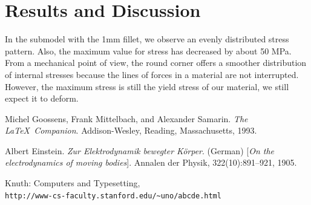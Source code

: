 \documentclass[12pt]{article}
\begin{document}
\pagebreak
\section{Results and Discussion}

In the submodel with the 1mm fillet, we observe an evenly distributed stress pattern. Also,
the maximum value for stress has decreased by about 50 MPa. From a mechanical point of view, 
the round corner offers a smoother distribution of internal stresses because the lines of 
forces in a material are not interrupted. However, the maximum stress is still the yield 
stress of our material, we still expect it to deform.

\pagebreak
\begin{thebibliography}{9}

  

  Michel Goossens, Frank Mittelbach, and Alexander Samarin. 
  \textit{The \LaTeX\ Companion}. 
  Addison-Wesley, Reading, Massachusetts, 1993.
   
  Albert Einstein. 
  \textit{Zur Elektrodynamik bewegter K{\"o}rper}. (German) 
  [\textit{On the electrodynamics of moving bodies}]. 
  Annalen der Physik, 322(10):891–921, 1905.
   
  Knuth: Computers and Typesetting,
  \\\texttt{http://www-cs-faculty.stanford.edu/\~{}uno/abcde.html}
\end{thebibliography}
\end{document}

